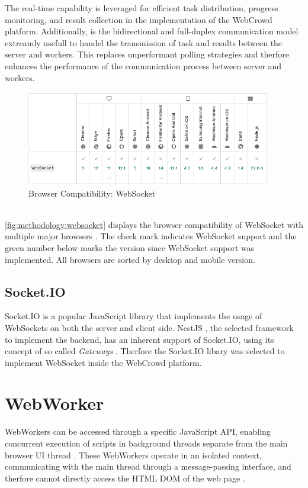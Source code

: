 The real-time capability is leveraged for efficient task distribution, progress monitoring, and result collection in the implementation of the WebCrowd platform. Additionally, is the bidirectional and full-duplex communication model extreamly usefull to handel the transmission of task and results between the server and workers. This replaces unperformant polling strategies and therfore enhances the performance of the communication process between server and workers.
\begin{figure}[htbp]
  \centering
  \includegraphics[width=0.95\textwidth]{gfx/figures/websocket-browsercompability.png}
  \caption{Browser Compatibility: WebSocket \cite{methodology:websockets1}}
  \label{fig:methodology:websocket}
\end{figure}
~\\
\autoref{fig:methodology:websocket} displays the browser compatibility of WebSocket with multiple major browsers \cite{methodology:websockets1}. The check mark indicates WebSocket support and the green number below marks the version since WebSocket support was implemented. All browsers are sorted by desktop and mobile version. 

\subsection{Socket.IO}
Socket.IO \cite{methodology:websockets2} is a popular JavaScript library that implements the usage of WebSockets on both the server and client side. NestJS \cite{methodology:nestjs}, the selected framework to implement the backend, has an inherent support of Socket.IO, using its concept of so called \emph{Gateways} \cite{methodology:nestjs}. Therfore the Socket.IO libary was selected to implement WebSocket inside the WebCrowd platform.

\section{WebWorker}
\label{sec:methodology:webworker}
WebWorkers can be accessed through a specific JavaScript \ac{API}, enabling concurrent execution of scripts in background threads separate from the main browser UI thread \cite{methodology:webworkers}. These WebWorkers operate in an isolated context, communicating with the main thread through a message-passing interface, and therfore cannot directly access the \acs{HTML} \acs{DOM} of the web page \cite{methodology:webworkers}. 

